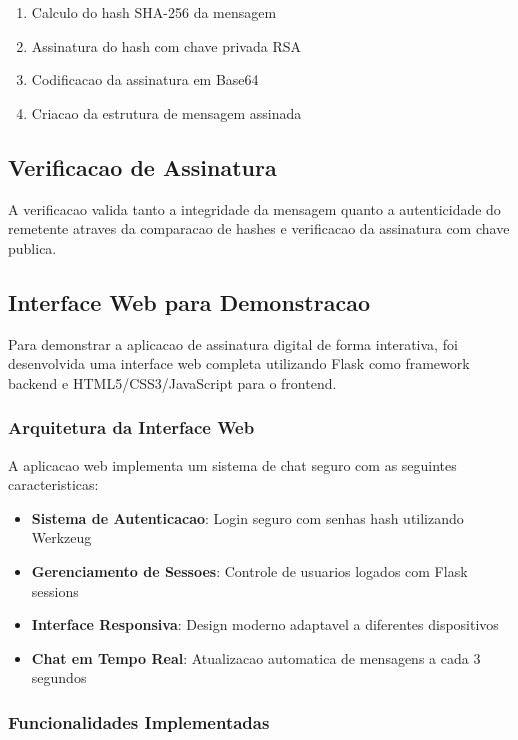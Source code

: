 \documentclass[12pt,a4paper,oneside]{article}
\begin{document}
\begin{enumerate}
    \item Calculo do hash SHA-256 da mensagem
    \item Assinatura do hash com chave privada RSA
    \item Codificacao da assinatura em Base64
    \item Criacao da estrutura de mensagem assinada
\end{enumerate}

\subsection{Verificacao de Assinatura}

A verificacao valida tanto a integridade da mensagem quanto a autenticidade do remetente atraves da comparacao de hashes e verificacao da assinatura com chave publica.

\subsection{Interface Web para Demonstracao}

Para demonstrar a aplicacao de assinatura digital de forma interativa, foi desenvolvida uma interface web completa utilizando Flask como framework backend e HTML5/CSS3/JavaScript para o frontend.

\subsubsection{Arquitetura da Interface Web}

A aplicacao web implementa um sistema de chat seguro com as seguintes caracteristicas:

\begin{itemize}
    \item \textbf{Sistema de Autenticacao}: Login seguro com senhas hash utilizando Werkzeug
    \item \textbf{Gerenciamento de Sessoes}: Controle de usuarios logados com Flask sessions
    \item \textbf{Interface Responsiva}: Design moderno adaptavel a diferentes dispositivos
    \item \textbf{Chat em Tempo Real}: Atualizacao automatica de mensagens a cada 3 segundos
\end{itemize}

\subsubsection{Funcionalidades Implementadas}
\end{document}
